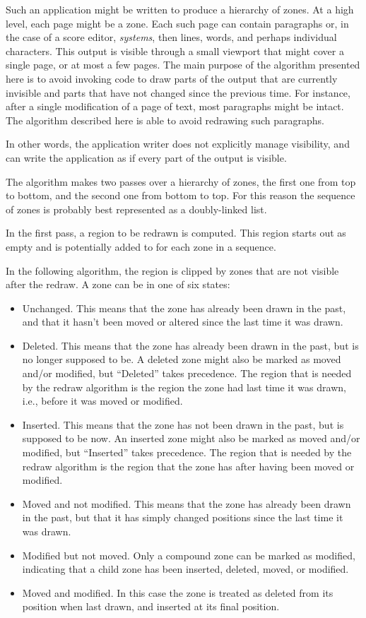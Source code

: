 \documentclass{report}
\begin{document}
Such an application might be written to produce a hierarchy of
zones.  At a high level, each page might be a zone.  Each such
page can contain paragraphs or, in the case of a score editor,
\emph{systems}, then lines, words, and perhaps individual characters.
This output is visible through a small viewport that might cover a
single page, or at most a few pages.  The main purpose of the
algorithm presented here is to avoid invoking code to draw parts of
the output that are currently invisible and parts that have not changed
since the previous time.  For instance, after a single modification of
a page of text, most paragraphs might be intact.  The algorithm
described here is able to avoid redrawing such paragraphs. 

In other words, the application writer does not explicitly manage
visibility, and can write the application as if every part of the
output is visible.

The algorithm makes two passes over a hierarchy of zones, the first
one from top to bottom, and the second one from bottom to top.  For
this reason the sequence of zones is probably best represented as a
doubly-linked list.

In the first pass, a region to be redrawn is computed.  This region
starts out as empty and is potentially added to for each zone in a
sequence.  

In the following algorithm, the region is clipped by zones that are
not visible after the redraw.  A zone can be in one of six states:

\begin{itemize}
\item Unchanged.  This means that the zone has already been drawn in
  the past, and that it hasn't been moved or altered since the last
  time it was drawn.
\item Deleted.  This means that the zone has already been drawn in
  the past, but is no longer supposed to be.  A deleted zone
  might also be marked as moved and/or modified, but ``Deleted'' takes
  precedence.  The region that is needed by the redraw algorithm is
  the region the zone had last time it was drawn, i.e., before
  it was moved or modified.
\item Inserted.  This means that the zone has not been drawn in the
  past, but is supposed to be now.  An inserted zone might also be
  marked as moved and/or modified, but ``Inserted'' takes precedence.
  The region that is needed by the redraw algorithm is the region that
  the zone has after having been moved or modified.
\item Moved and not modified.  This means that the zone has already
  been drawn in the past, but that it has simply changed positions
  since the last time it was drawn.
\item Modified but not moved.  Only a compound zone can be marked as
  modified, indicating that a child zone has been
  inserted, deleted, moved, or modified.
\item Moved and modified.  In this case the zone is treated as
  deleted from its position when last drawn, and inserted at its
  final position. 
\end{itemize}
\end{document}
